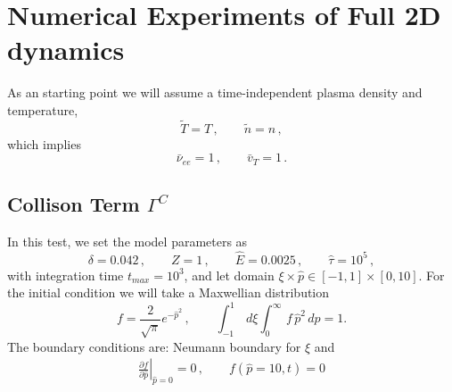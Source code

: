 \documentclass[preprint,11pt]{elsarticle}
\newcommand{\bq}{\begin{equation}}
\newcommand{\eq}{\end{equation}}
\begin{document}
\section{Numerical Experiments of Full 2D dynamics}\label{Sect:FullModel}

As an starting point we will assume a time-independent plasma density and temperature, 
\bq
{\tilde T}=T \, , \qquad {\tilde n}=n \, ,
\eq
which implies 
\bq
 \bar{\nu}_{ee}=1 \, , \qquad \bar{v}_T=1 \, .
 \eq
\subsection{Collison Term $\Gamma^C$}
 In this test, we set the model parameters as%
\bq
\delta=0.042 \, , \qquad Z=1 \, , \qquad {\hat E}=0.0025 \, , \qquad \hat{\tau}=10^5 \, ,
\eq
with integration time $t_{max}=10^3$, and let domain $\xi\times\hat{p}\in [-1,1]\times[0,10]$.
For the initial condition we will take a Maxwellian distribution
\bq
f= \frac{2}{\sqrt \pi} e^{-{\hat p}^2} \, , \qquad \int_{-1}^1\,  d \xi  \int_{0}^\infty \, f \, {\hat p}^2 \, d {\hat p} =1.  
\eq
The boundary conditions are: Neumann boundary for $\xi$ and 
\begin{eqnarray*}
\left. \frac{\partial f}{\partial \hat{p}}\right|_{\hat{p}=0}=0 \, , \qquad f(\hat{p}=10,t)=0
\end{eqnarray*}


%
\end{document}
